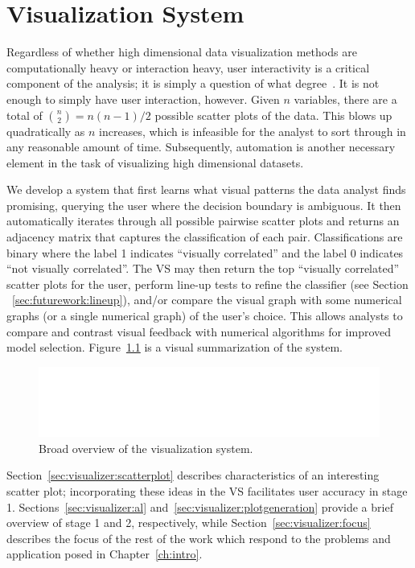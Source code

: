\chapter{Visualization System \label{ch:visualizer}}

Regardless of whether high dimensional data visualization methods are
computationally heavy or interaction heavy, user interactivity is a critical
component of the analysis; it is simply a question of what 
degree~\cite{lius2016}. It is not enough to simply have user interaction, 
however. Given $n$ variables, there are a total of ${n \choose 2} = n(n-1)/2$ 
possible scatter plots of the data. This blows up quadratically as $n$ 
increases, which is infeasible for the analyst to sort through in any 
reasonable amount of time. Subsequently, automation is another necessary 
element in the task of visualizing high dimensional datasets.

We develop a system that first learns what visual patterns the data analyst 
finds promising, querying the user where the decision boundary is ambiguous. It 
then automatically iterates through all possible pairwise scatter plots and 
returns an adjacency matrix that captures the classification of each pair. 
Classifications are binary where the label 1 indicates ``visually correlated'' 
and the label 0 indicates ``not visually correlated''. The VS may then return 
the top ``visually correlated'' scatter plots for the user, perform line-up 
tests to refine the classifier (see Section ~\ref{sec:futurework:lineup}), 
and/or compare the visual graph with some numerical graphs (or a single 
numerical graph) of the user's choice. This allows analysts to compare and 
contrast visual feedback with numerical algorithms for improved model 
selection. 
Figure~\ref{fig:visualizer:vs} is a visual summarization of the system.
       
\begin{figure}[htb]
	\begin{center}
		\includegraphics[width=1\linewidth]{ch-visualizer/figures/vs}
		\caption[Broad overview of the visualization system.]{Broad overview of 
		the visualization system.}
		\label{fig:visualizer:vs}
	\end{center}
\end{figure}

Section~\ref{sec:visualizer:scatterplot} describes characteristics of an 
interesting scatter plot; incorporating these ideas in the VS facilitates user 
accuracy in stage 1. 
Sections~\ref{sec:visualizer:al} and~\ref{sec:visualizer:plotgeneration} 
provide a brief overview of stage 1 and 2, respectively, while 
Section~\ref{sec:visualizer:focus} describes the focus of the rest of the work 
which respond to the problems and application posed in Chapter~\ref{ch:intro}.





